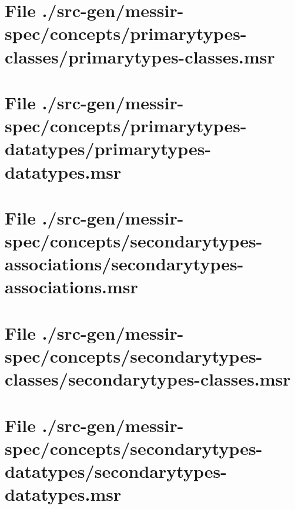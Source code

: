 \section[File /src-gen/messir-spec/concepts/primarytypes-classes/primarytypes-classes.msr]{File ./src-gen/messir-spec/concepts/primarytypes-classes/primarytypes-classes.msr}
\scriptsize

\normalsize
	
\section[File /src-gen/messir-spec/concepts.../primarytypes-datatypes.msr]{File ./src-gen/messir-spec/concepts/primarytypes-datatypes/primarytypes-datatypes.msr}
\scriptsize

\normalsize
	
\section[File /src-gen/messir-spec/concepts.../secondarytypes-associations.msr]{File ./src-gen/messir-spec/concepts/secondarytypes-associations/secondarytypes-associations.msr}
\scriptsize

\normalsize
	
\section[File /src-gen/messir-spec/concepts.../secondarytypes-classes.msr]{File ./src-gen/messir-spec/concepts/secondarytypes-classes/secondarytypes-classes.msr}
\scriptsize

\normalsize
	
\section[File /src-gen/messir-spec/concepts.../secondarytypes-datatypes.msr]{File ./src-gen/messir-spec/concepts/secondarytypes-datatypes/secondarytypes-datatypes.msr}
\scriptsize

\normalsize
	
